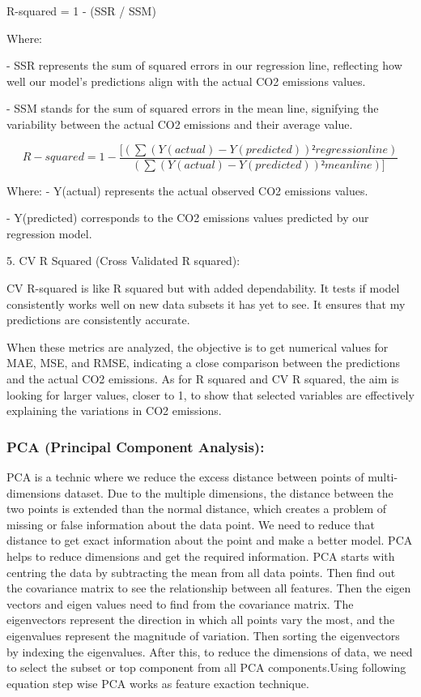 \documentclass[12pt, a4paper,oneside]{book}
\numberwithin{equation}{section}
\begin{document}
R-squared = 1 - (SSR / SSM)


Where:

- SSR represents the sum of squared errors in our regression line, reflecting how well our model's predictions align with the actual CO2 emissions values.

- SSM stands for the sum of squared errors in the mean line, signifying the variability between the actual CO2 emissions and their average value.

\begin{equation}
    R-squared = 1 - \frac {[(\sum (Y(actual) - Y(predicted))² regression line)} {(\sum (Y(actual) - Y(predicted))² mean line)]}
\end{equation}



Where:
- Y(actual) represents the actual observed CO2 emissions values.

- Y(predicted) corresponds to the CO2 emissions values predicted by our regression model.

\hfill \break

5. CV R Squared (Cross Validated R squared): 

CV R-squared is like R squared but with added dependability. It tests if model consistently works well on new data subsets it has yet to see. It ensures that my predictions are consistently accurate.

When these metrics are analyzed, the objective is to get numerical values for MAE, MSE, and RMSE, indicating a close comparison between the predictions and the actual CO2 emissions. As for R squared and CV R squared, the aim is looking for larger values, closer to 1, to show that selected variables are effectively explaining the variations in CO2 emissions.



\subsubsection{PCA (Principal Component Analysis):}



PCA is a technic where we reduce the excess distance between points of multi-dimensions dataset. Due to the multiple dimensions, the distance between the two points is extended than the normal distance, which creates a problem of missing or false information about the data point. We need to reduce that distance to get exact information about the point and make a better model. PCA helps to reduce dimensions and get the required information. PCA starts with centring the data by subtracting the mean from all data points. Then find out the covariance matrix to see the relationship between all features. Then the eigen vectors and eigen values need to find from the covariance matrix. The eigenvectors represent the direction in which all points vary the most, and the eigenvalues represent the magnitude of variation. Then sorting the eigenvectors by indexing the eigenvalues. After this, to reduce the dimensions of data, we need to select the subset or top component from all PCA components.Using following equation step wise PCA works as feature exaction technique.~\cite{ref14}
\end{document}
